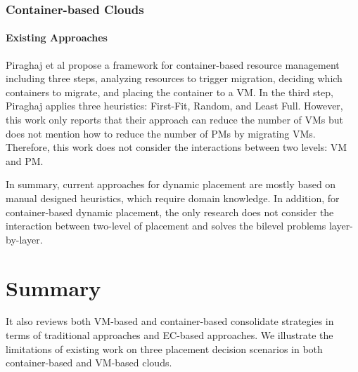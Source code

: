 \subsubsection{Container-based Clouds}
\paragraph{Existing Approaches}
Piraghaj et al \cite{Piraghaj:2015dv} propose a framework for container-based resource management including three steps, analyzing resources to trigger migration, deciding which containers to migrate, and placing the container to a VM. In the third step, Piraghaj applies three heuristics: First-Fit, Random, and Least Full. However, this work only reports that their approach can reduce the number of VMs but does not mention how to reduce the number of PMs by migrating VMs. Therefore, this work does not consider the interactions between two levels: VM and PM. 


\vspace{5mm}

In summary, current approaches for dynamic placement are mostly based on manual designed heuristics, which require domain knowledge. In addition, for container-based dynamic placement, the only research does not consider the interaction between two-level of placement and solves the bilevel problems layer-by-layer.

\section{Summary}

 It also reviews both VM-based and container-based consolidate strategies in terms of traditional approaches and EC-based approaches. We illustrate the limitations of existing work on three placement decision scenarios in both container-based and VM-based clouds. 

